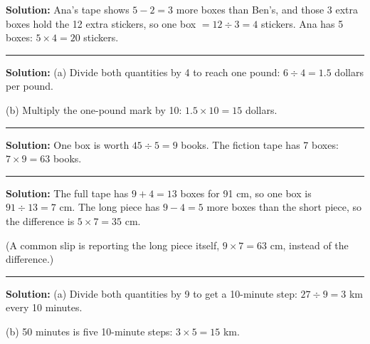 \documentclass[12pt]{article}
\begin{document}
\textbf{Solution:} Ana's tape shows $5 - 2 = 3$ more boxes than Ben's, and those
3 extra boxes hold the 12 extra stickers, so one box $= 12 \div 3 = 4$ stickers.
Ana has 5 boxes: $5 \times 4 = 20$ stickers. 

\vspace{0.3cm}\noindent\rule{\linewidth}{0.2pt}\vspace{0.3cm}


\textbf{Solution:} (a) Divide both quantities by 4 to reach one pound:
$6 \div 4 = 1.5$ dollars per pound. 

(b) Multiply the one-pound mark by 10: $1.5 \times 10 = 15$ dollars. 

\vspace{0.3cm}\noindent\rule{\linewidth}{0.2pt}\vspace{0.3cm}


\textbf{Solution:} One box is worth $45 \div 5 = 9$ books. The fiction tape has
7 boxes: $7 \times 9 = 63$ books. 

\vspace{0.3cm}\noindent\rule{\linewidth}{0.2pt}\vspace{0.3cm}


\textbf{Solution:} The full tape has $9 + 4 = 13$ boxes for 91 cm, so one box is
$91 \div 13 = 7$ cm. The long piece has $9 - 4 = 5$ more boxes than the short
piece, so the difference is $5 \times 7 = 35$ cm. 

(A common slip is reporting the long piece itself, $9 \times 7 = 63$ cm, instead
of the difference.)

\vspace{0.3cm}\noindent\rule{\linewidth}{0.2pt}\vspace{0.3cm}


\textbf{Solution:} (a) Divide both quantities by 9 to get a 10-minute step:
$27 \div 9 = 3$ km every 10 minutes. 

(b) 50 minutes is five 10-minute steps: $3 \times 5 = 15$ km. 
\end{document}
